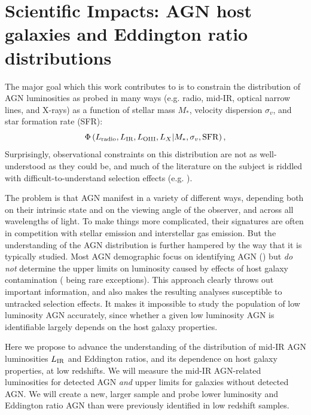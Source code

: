 \documentclass[12pt, preprint]{hacked-aastex}
\begin{document}
\section{Scientific Impacts: AGN host galaxies and Eddington ratio distributions}\label{sec:impacts}


The major goal which this work contributes to is to constrain the
distribution of AGN luminosities as probed in many ways (e.g. radio,
mid-IR, optical narrow lines, and X-rays) as a function of stellar
mass $M_\ast$, velocity dispersion $\sigma_v$, and star formation rate
(SFR):
\begin{equation}
\label{eq:model}
\Phi\left(L_{\rm radio}, L_{\rm IR}, L_{\rm OIII}, L_X | M_\ast, \sigma_v, {\rm SFR}\right),
\end{equation}
Surprisingly, observational constraints on this distribution are not
as well-understood as they could be, and much of the literature on the
subject is riddled with difficult-to-understand selection effects
(e.g. \cite{trump15a, jones17a, hviding22a}).

The problem is that AGN manifest in a variety of different ways,
depending both on their intrinsic state and on the viewing angle of
the observer, and across all wavelengths of light.  To make things
more complicated, their signatures are often in competition with
stellar emission and interstellar gas emission.  But the understanding
of the AGN distribution is further hampered by the way that it is
typically studied. Most AGN demographic focus on identifying AGN
(\cite{kauffmann03b, lacy15a, sanchez18a, comerford20a, greene20a})
but {\it do not} determine the upper limits on luminosity caused by
effects of host galaxy contamination (\cite{trump15a, jones17a} being
rare exceptions). This approach clearly throws out important
information, and also makes the resulting analyses susceptible to
untracked selection effects. It makes it impossible to study the
population of low luminosity AGN accurately, since whether a given low
luminosity AGN is identifiable largely depends on the host galaxy
properties.

Here we propose to advance the understanding of the distribution of
mid-IR AGN luminosities $L_{\rm IR}$ and Eddington ratios, and its
dependence on host galaxy properties, at low redshifts.  We will
measure the mid-IR AGN-related luminosities for detected AGN {\it and}
upper limits for galaxies without detected AGN. We will create a new,
larger sample and probe lower luminosity and Eddington ratio AGN than
were previously identified in low redshift samples.
\end{document}
